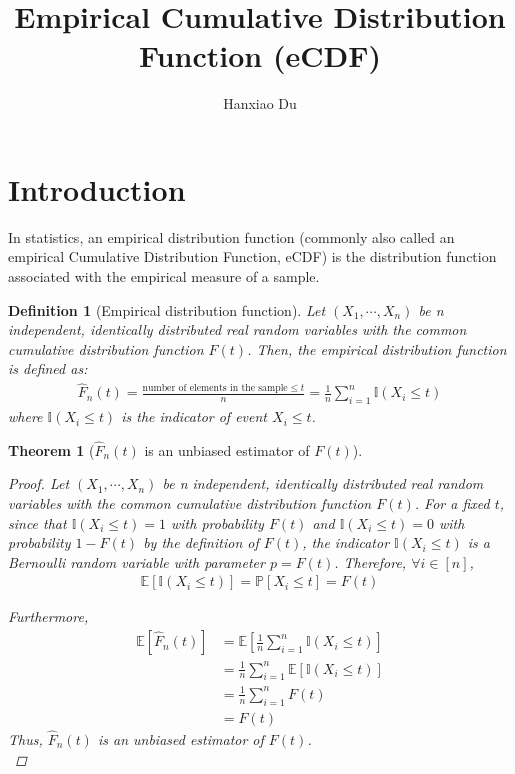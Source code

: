 \documentclass[12pt,a4paper]{article}
\title{Empirical Cumulative Distribution Function (eCDF)}
\author{Hanxiao Du}
\date{}
\newtheorem{theorem}{Theorem}
\newtheorem{definition}{Definition}
\begin{document}
\maketitle

\section{Introduction}
In statistics, an empirical distribution function (commonly also called an empirical Cumulative Distribution Function, eCDF) is the distribution function associated with the empirical measure of a sample.

\begin{definition}[Empirical distribution function]
Let $(X_1, \cdots, X_n)$ be n independent, identically distributed real random variables with the common cumulative distribution function $F(t)$. Then, the empirical distribution function is defined as:
\begin{align}
\hat{F}_n(t) = \frac{\text{number of elements in the sample} \leq t}{n} = \frac{1}{n} \sum_{i=1}^n \mathbb{I}(X_i \leq t)
\end{align}
where $\mathbb{I}(X_i \leq t)$ is the indicator of event $X_i \leq t$.
\end{definition}
\begin{theorem}[$\hat{F}_n(t)$ is an unbiased estimator of $F(t)$]
\ \\
\begin{proof}
Let $(X_1, \cdots, X_n)$ be n independent, identically distributed real random variables with the common cumulative distribution function $F(t)$.
For a fixed $t$, since that $\mathbb{I}(X_i \leq t) = 1$ with probability $F(t)$ and $\mathbb{I}(X_i \leq t) = 0$ with probability $1-F(t)$ by the definition of $F(t)$, the indicator $\mathbb{I}(X_i \leq t)$ is a Bernoulli random variable with parameter $p=F(t)$. Therefore, $\forall i \in [n]$,
\begin{align}
\mathbb{E}[\mathbb{I}(X_i \leq t)] = \mathbb{P}[X_i \leq t] = F(t)
\end{align}

Furthermore,
\begin{align}
\mathbb{E}[\hat{F}_n(t)] &= \mathbb{E}[\frac{1}{n} \sum_{i=1}^n \mathbb{I}(X_i \leq t)]\\
&= \frac{1}{n} \sum_{i=1}^n \mathbb{E}[\mathbb{I}(X_i \leq t)]\\
&= \frac{1}{n} \sum_{i=1}^n F(t)\\
&= F(t)
\end{align}
Thus, $\hat{F}_n(t)$ is an unbiased estimator of $F(t)$.\\ 
\end{proof}
\end{theorem}
\end{document}
